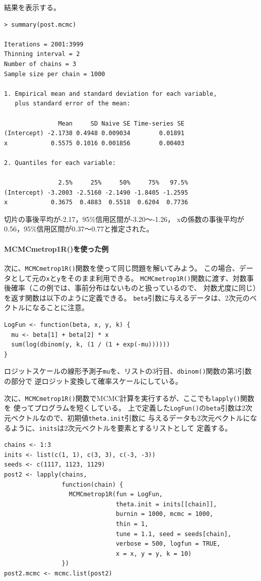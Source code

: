 \documentclass[11pt,uplatex]{jsarticle}
\begin{document}
結果を表示する。
\begin{lstlisting}
> summary(post.mcmc)

Iterations = 2001:3999
Thinning interval = 2 
Number of chains = 3 
Sample size per chain = 1000 

1. Empirical mean and standard deviation for each variable,
   plus standard error of the mean:

               Mean     SD Naive SE Time-series SE
(Intercept) -2.1738 0.4948 0.009034        0.01891
x            0.5575 0.1016 0.001856        0.00403

2. Quantiles for each variable:

               2.5%     25%     50%     75%   97.5%
(Intercept) -3.2003 -2.5160 -2.1490 -1.8405 -1.2595
x            0.3675  0.4883  0.5518  0.6204  0.7736

\end{lstlisting}
切片の事後平均が-2.17，95\%信用区間が-3.20〜-1.26，
xの係数の事後平均が0.56，95\%信用区間が0.37〜0.77と推定された。

\paragraph{MCMCmetrop1R()を使った例}

次に、\texttt{MCMCmetrop1R()}関数を使って同じ問題を解いてみよう。
この場合、データとして元の\texttt{x}と\texttt{y}をそのまま利用できる。
\texttt{MCMCmetrop1R()}関数に渡す、対数事後確率（この例では、事前分布はないものと扱っているので、
対数尤度に同じ）を返す関数は以下のように定義できる。
\texttt{beta}引数に与えるデータは、2次元のベクトルになることに注意。

\begin{lstlisting}
LogFun <- function(beta, x, y, k) {
  mu <- beta[1] + beta[2] * x
  sum(log(dbinom(y, k, (1 / (1 + exp(-mu))))))
}
\end{lstlisting}

\noindent
ロジットスケールの線形予測子\texttt{mu}を、リストの3行目、\texttt{dbinom()}関数の第3引数の部分で
逆ロジット変換して確率スケールにしている。

次に、\texttt{MCMCmetrop1R()}関数でMCMC計算を実行するが、ここでも\texttt{lapply()}関数を
使ってプログラムを短くしている。
上で定義した\texttt{LogFun()}の\texttt{beta}引数は2次元ベクトルなので、初期値\texttt{theta.init}引数に
与えるデータも2次元ベクトルになるように、\texttt{inits}は2次元ベクトルを要素とするリストとして
定義する。


\begin{lstlisting}
chains <- 1:3
inits <- list(c(1, 1), c(3, 3), c(-3, -3))
seeds <- c(1117, 1123, 1129)
post2 <- lapply(chains,
                function(chain) {
                  MCMCmetrop1R(fun = LogFun,
                               theta.init = inits[[chain]],
                               burnin = 1000, mcmc = 1000,
                               thin = 1,
                               tune = 1.1, seed = seeds[chain],
                               verbose = 500, logfun = TRUE,
                               x = x, y = y, k = 10)
                })
post2.mcmc <- mcmc.list(post2)
\end{lstlisting}
\end{document}
